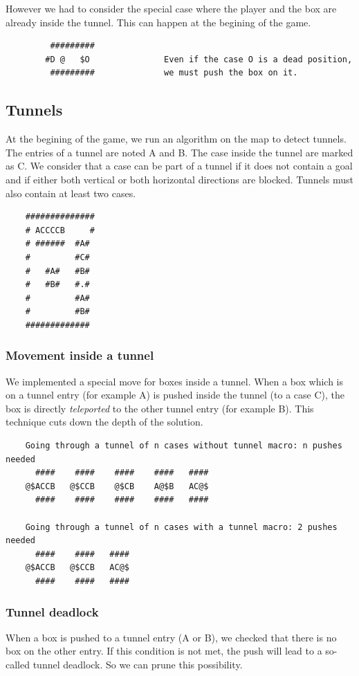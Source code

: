 \documentclass[a4paper,10pt]{article}
\begin{document}
		However we had to consider the special case where the player and the box are already inside the tunnel. 
		This can happen at the begining of the game.
		\begin{verbatim}
		 #########
		#D @   $O               Even if the case O is a dead position, 
		 #########              we must push the box on it.
		\end{verbatim}

	\subsection{Tunnels}
	At the begining of the game, we run an algorithm on the map to detect tunnels.
	The entries of a tunnel are noted A and B. The case inside the tunnel are marked as C.
	We consider that a case can be part of a tunnel if it does not contain a goal 
	and if either both vertical or both horizontal directions are blocked.
	Tunnels must also contain at least two cases.
	\begin{verbatim}
    ##############
    # ACCCCB     #
    # ######  #A#
    #         #C#
    #   #A#   #B#
    #   #B#   #.#
    #         #A#
    #         #B#
    #############
	\end{verbatim}

	\subsubsection{Movement inside a tunnel}
	We implemented a special move for boxes inside a tunnel. 
	When a box which is on a tunnel entry (for example A) is pushed inside the tunnel (to a case C), the
	box is directly \textit{teleported} to the other tunnel entry (for example B).
	This technique cuts down the depth of the solution.

	\begin{verbatim}
	Going through a tunnel of n cases without tunnel macro: n pushes needed
	  ####    ####    ####    ####   ####
	@$ACCB   @$CCB    @$CB    A@$B   AC@$
	  ####    ####    ####    ####   ####

	Going through a tunnel of n cases with a tunnel macro: 2 pushes needed
	  ####    ####   ####
	@$ACCB   @$CCB   AC@$
	  ####    ####   ####

	\end{verbatim}

	\subsubsection{Tunnel deadlock}
	When a box is pushed to a tunnel entry (A or B), we checked that there is no box on the other entry.
	If this condition is not met, the push will lead to a so-called tunnel deadlock. 
	So we can prune this possibility.
\end{document}
